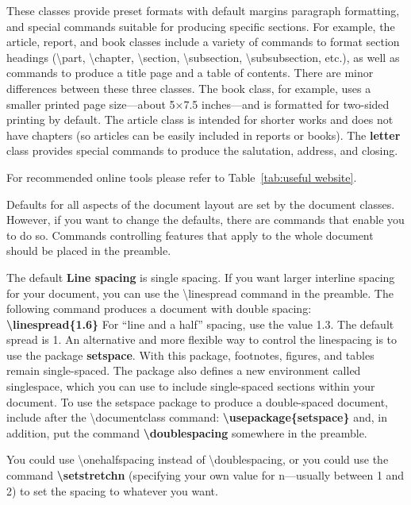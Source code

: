 \documentclass[a4paper,11pt,UTF8,openright]{book}
\begin{document}
These classes provide preset formats with default margins paragraph formatting, and special commands suitable for producing specific sections. For example, the article, report, and book classes include a variety of commands to format section headings
(\textbackslash part, \textbackslash chapter, \textbackslash section, \textbackslash subsection, \textbackslash subsubsection, etc.), as well as commands to produce a title page and a table of contents. There are minor differences between these three classes. The book class, for example, uses a smaller printed page size—about 5×7.5 inches—and is formatted for two-sided printing by default. The article class is intended for shorter works and does not have chapters (so articles can be easily included in reports or books). The \textbf{letter} class provides special commands to produce the salutation, address, and closing.


\noindent For recommended online tools please refer to Table~\ref{tab:useful website}.

Defaults for all aspects of the document layout are set by the document classes. However,
if you want to change the defaults, there are commands that enable you to do so.
Commands controlling features that apply to the whole document should be placed in
the preamble.

The default \textbf{Line spacing} is single spacing. If you want larger interline spacing for your document, you can use the \textbackslash linespread command in the preamble. The following command produces a document with double spacing: \textbf{\textbackslash linespread\{1.6\}} For “line and a half” spacing, use the value 1.3. The default spread is 1. An alternative and more flexible way to control the linespacing is to use the package \textbf{setspace}. With this package, footnotes, figures, and tables remain single-spaced. The package also defines a new environment called singlespace, which you can use to include single-spaced sections within your document. To use the setspace package to produce a double-spaced document, include after the \textbackslash documentclass command: \textbf{\textbackslash usepackage\{setspace\}} and, in addition, put the command \textbf{\textbackslash doublespacing} somewhere in the preamble.

You could use \textbackslash onehalfspacing instead of \textbackslash doublespacing, or you could use the command \textbf{\textbackslash setstretch{n}} (specifying your own value for n—usually between 1 and 2) to set the spacing to whatever you want.
\end{document}
